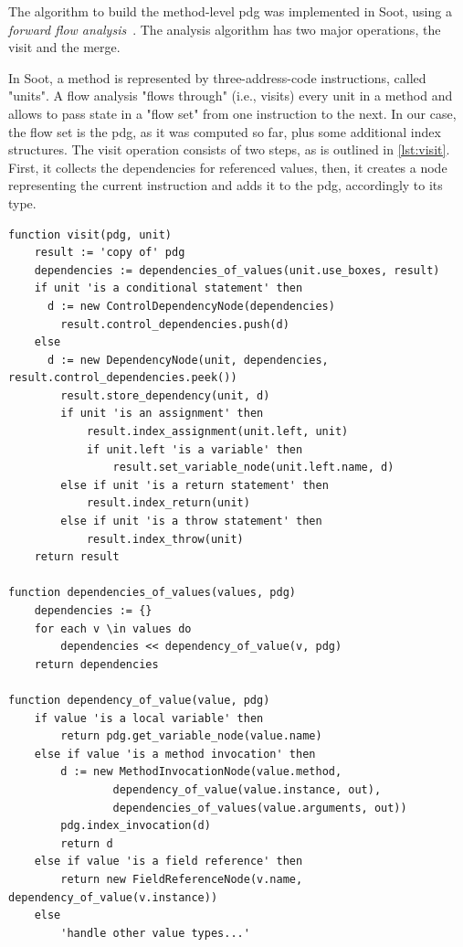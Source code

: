 The algorithm to build the method-level \ac{pdg} was implemented in Soot, using a \emph{forward flow analysis}~\cite{lam_11_the_soot_framework}.
The analysis algorithm has two major operations, the visit and the merge.

In Soot, a method is represented by three-address-code instructions, called "units".
A flow analysis "flows through" (i.e., visits) every unit in a method and allows to pass state in a "flow set" from one instruction to the next.
In our case, the flow set is the \ac{pdg}, as it was computed so far, plus some additional index structures.
The visit operation consists of two steps, as is outlined in \cref{lst:visit}.
First, it collects the dependencies for referenced values, 
then, it creates a node representing the current instruction and adds it to the \ac{pdg}, accordingly to its type.

\begin{lstlisting}[firstnumber=1,float,caption={The algorithm of the visit operation.},stepnumber=5,label=lst:visit,gobble=0,language=algorithm,tabsize=2]
function visit(pdg, unit)
	result := 'copy of' pdg
	dependencies := dependencies_of_values(unit.use_boxes, result)
	if unit 'is a conditional statement' then
	  d := new ControlDependencyNode(dependencies)
		result.control_dependencies.push(d)
	else
	  d := new DependencyNode(unit, dependencies, result.control_dependencies.peek())
		result.store_dependency(unit, d)
		if unit 'is an assignment' then
			result.index_assignment(unit.left, unit)
			if unit.left 'is a variable' then
				result.set_variable_node(unit.left.name, d)
		else if unit 'is a return statement' then
			result.index_return(unit)
		else if unit 'is a throw statement' then
			result.index_throw(unit)
	return result

function dependencies_of_values(values, pdg)
	dependencies := {}
	for each v \in values do
		dependencies << dependency_of_value(v, pdg)
	return dependencies

function dependency_of_value(value, pdg)
	if value 'is a local variable' then
		return pdg.get_variable_node(value.name)
	else if value 'is a method invocation' then
		d := new MethodInvocationNode(value.method, 
				dependency_of_value(value.instance, out), 
				dependencies_of_values(value.arguments, out))
		pdg.index_invocation(d)
		return d
	else if value 'is a field reference' then
		return new FieldReferenceNode(v.name, dependency_of_value(v.instance))
	else 
		'handle other value types...'
\end{lstlisting}

